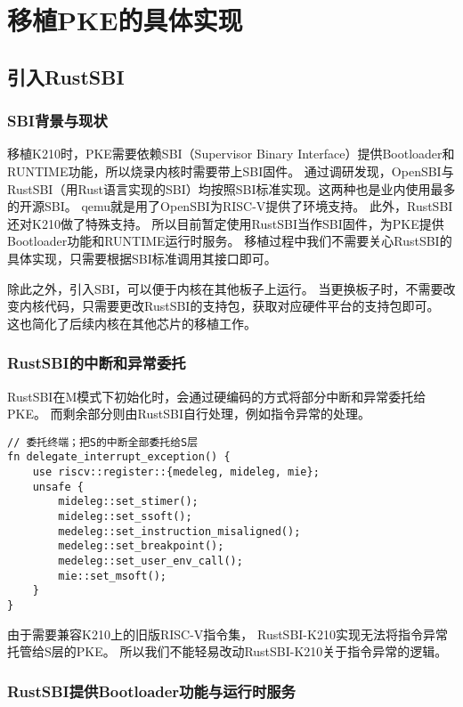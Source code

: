 \chapter{移植PKE的具体实现}

\section{引入RustSBI}

\subsection{SBI背景与现状}

移植K210时，PKE需要依赖SBI（Supervisor Binary Interface）提供Bootloader和RUNTIME功能，所以烧录内核时需要带上SBI固件。
通过调研发现，OpenSBI与RustSBI（用Rust语言实现的SBI）均按照SBI标准实现。这两种也是业内使用最多的开源SBI。
qemu就是用了OpenSBI为RISC-V提供了环境支持。
此外，RustSBI还对K210做了特殊支持。
所以目前暂定使用RustSBI当作SBI固件，为PKE提供Bootloader功能和RUNTIME运行时服务。
移植过程中我们不需要关心RustSBI的具体实现，只需要根据SBI标准调用其接口即可。

除此之外，引入SBI，可以便于内核在其他板子上运行。
当更换板子时，不需要改变内核代码，只需要更改RustSBI的支持包，获取对应硬件平台的支持包即可。
这也简化了后续内核在其他芯片的移植工作。

\subsection{RustSBI的中断和异常委托}

RustSBI在M模式下初始化时，会通过硬编码的方式将部分中断和异常委托给PKE。
而剩余部分则由RustSBI自行处理，例如指令异常的处理。

\begin{lstlisting}[caption={RustSBI的中断和异常委托}, label={lst:rustsbi_interrupt_and_exception}]
// 委托终端；把S的中断全部委托给S层
fn delegate_interrupt_exception() {
    use riscv::register::{medeleg, mideleg, mie};
    unsafe {
        mideleg::set_stimer();
        mideleg::set_ssoft();
        medeleg::set_instruction_misaligned();
        medeleg::set_breakpoint();
        medeleg::set_user_env_call();
        mie::set_msoft();
    }
}
\end{lstlisting}

由于需要兼容K210上的旧版RISC-V指令集，
RustSBI-K210实现无法将指令异常托管给S层的PKE。
所以我们不能轻易改动RustSBI-K210关于指令异常的逻辑。

\subsection{RustSBI提供Bootloader功能与运行时服务}

